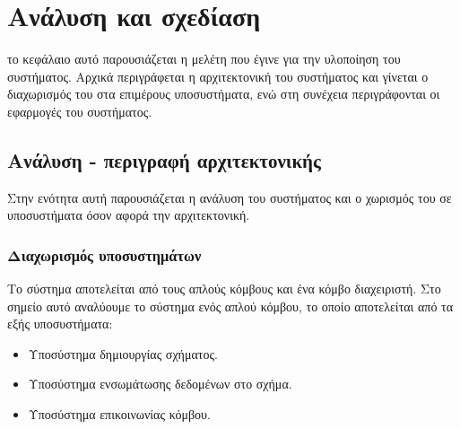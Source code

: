 \chapter{Ανάλυση και σχεδίαση}
το κεφάλαιο αυτό παρουσιάζεται η μελέτη που έγινε για την υλοποίηση του συστήματος. Αρχικά περιγράφεται η αρχιτεκτονική του
συστήματος και γίνεται ο διαχωρισμός του στα επιμέρους
υποσυστήματα, ενώ στη συνέχεια περιγράφονται οι εφαρμογές του
συστήματος.

\section{Ανάλυση - περιγραφή αρχιτεκτονικής}
Στην ενότητα αυτή παρουσιάζεται η ανάλυση του συστήματος και ο
χωρισμός του σε υποσυστήματα όσον αφορά την αρχιτεκτονική.

\subsection{Διαχωρισμός υποσυστημάτων}
Το σύστημα αποτελείται από τους απλούς κόμβους και ένα κόμβο
διαχειριστή. Στο σημείο αυτό αναλύουμε το σύστημα ενός απλού
κόμβου, το οποίο αποτελείται από τα εξής υποσυστήματα:

\begin{itemize}
\item Υποσύστημα δημιουργίας σχήματος.
\item Υποσύστημα ενσωμάτωσης δεδομένων στο σχήμα.
\item Υποσύστημα επικοινωνίας κόμβου.
\end{itemize}

